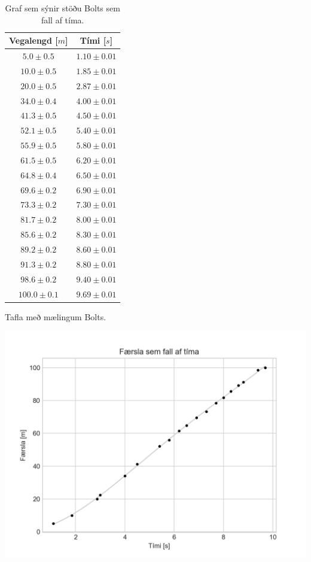 \begin{table}[H]
\begin{minipage}[b]{0.38\linewidth}
\centering
\begin{tabular}{|c|c|}
\hline
\textbf{Vegalengd} [$\si{m}$] & \textbf{Tími} [$\si{s}$]\\
\hline
$5.0 \pm 0.5$ & $1.10 \pm 0.01$  \\
$10.0 \pm 0.5$ & $1.85 \pm 0.01$  \\
$20.0 \pm 0.5$ & $2.87 \pm 0.01$  \\
$34.0 \pm 0.4$ & $4.00 \pm 0.01$   \\
$41.3 \pm 0.5$ & $4.50 \pm 0.01$  \\
$52.1 \pm 0.5$ & $5.40 \pm 0.01$  \\
$55.9 \pm 0.5$ & $5.80 \pm 0.01$    \\
$61.5 \pm 0.5$ & $6.20 \pm 0.01$  \\
$64.8 \pm 0.4$ & $6.50 \pm 0.01$   \\
$69.6 \pm 0.2$ & $6.90 \pm 0.01$   \\
$73.3 \pm 0.2$ & $7.30 \pm 0.01$ \\
$81.7 \pm 0.2$ & $8.00 \pm 0.01$   \\
$85.6 \pm 0.2$ & $8.30 \pm 0.01$   \\
$89.2 \pm 0.2$ & $8.60 \pm 0.01$ \\
$91.3 \pm 0.2$ & $8.80 \pm 0.01$ \\
$98.6 \pm 0.2$ & $9.40 \pm 0.01$ \\
$100.0 \pm 0.1$ & $9.69 \pm 0.01$ \\
\hline
\end{tabular}
\label{tafla:usain1}
\caption{Tafla með mælingum Bolts.}
\end{minipage}\hfill
\begin{minipage}[b]{0.6\linewidth}
\centering
\includegraphics[scale = 0.6]{images/plot_1.png}
\caption{Graf sem sýnir stöðu Bolts sem fall af tíma.}
\label{fig:bolt1}
\end{minipage}
\end{table}



